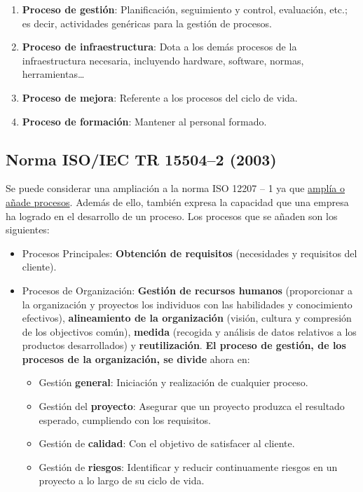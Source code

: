 \begin{enumerate}
    \item \textbf{Proceso de gestión}: Planificación, seguimiento y control, evaluación, etc.; es decir, actividades genéricas para la gestión de procesos.
    \item \textbf{Proceso de infraestructura}: Dota a los demás procesos de la infraestructura necesaria, incluyendo hardware, software, normas, herramientas\ldots
    \item \textbf{Proceso de mejora}: Referente a los procesos del ciclo de vida.
    \item \textbf{Proceso de formación}: Mantener al personal formado.
\end{enumerate}

\subsection{Norma ISO/IEC TR 15504--2 (2003)}
Se puede considerar una ampliación a la norma ISO 12207 – 1 ya que \uline{amplía o añade procesos}. Además de ello, también expresa la capacidad que una empresa ha logrado en el desarrollo de un proceso. Los procesos que se añaden son los siguientes:

\begin{itemize}
    \item Procesos Principales: \textbf{Obtención de requisitos} (necesidades y requisitos del cliente).
    \item Procesos de Organización: \textbf{Gestión de recursos humanos} (proporcionar a la organización y proyectos los individuos con las habilidades y conocimiento efectivos), \textbf{alineamiento de la organización} (visión, cultura y compresión de los objectivos común), \textbf{medida} (recogida y análisis de datos relativos a los productos desarrollados) y \textbf{reutilización}. \textbf{El proceso de gestión, de los procesos de la organización, se divide} ahora en:
          \begin{itemize}
              \item Gestión \textbf{general}: Iniciación y realización de cualquier proceso.
              \item Gestión del \textbf{proyecto}: Asegurar que un proyecto produzca el resultado esperado, cumpliendo con los requisitos.
              \item Gestión de \textbf{calidad}: Con el objetivo de satisfacer al cliente.
              \item Gestión de \textbf{riesgos}: Identificar y reducir continuamente riesgos en un proyecto a lo largo de su ciclo de vida.
          \end{itemize}
\end{itemize}


